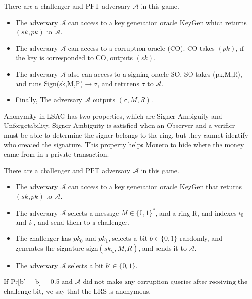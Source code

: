     \begin{definition} There are a challenger and PPT adversary $\mathcal A $ in this game.
    
    \begin{itemize}
    \item The adversary $\mathcal A $ can access to a key generation oracle KeyGen which returns $(sk,pk)$ to $\mathcal A $.
    \item The adversary $\mathcal A $ can access to a corruption oracle (CO). CO takes $(pk)$, if the key is corresponded to CO, outputs $(sk)$.
    \item The adversary $\mathcal A $ also can access to a signing oracle SO, SO takes (pk,M,R), and runs Sign(sk,M,R)$\rightarrow \sigma$, and returens $\sigma$ to $\mathcal A$.
    \item Finally, The adversary $\mathcal A $ outputs $(\sigma , M,R)$.
    \end{itemize}
    \end{definition}
    Anonymity in LSAG has two properties, which are Signer Ambiguity and Unforgetability. Signer Ambiguity is satisfied when an Observer and a verifier must be able to determine the signer belongs to the ring, but they cannot identify who created the signature. This property helps Monero to hide where the money came from in a private transaction.
    
    \begin{definition}[Anonymity] There are a challenger and PPT adversary $\mathcal A $ in this game.
    
    \begin{itemize}
        \item The adversary $\mathcal A $ can access to a key generation oracle KeyGen that returns $(sk,pk)$ to $\mathcal A $.
        \item  The adversary $\mathcal A $ selects a message $M \in \{ 0,1 \}^*$, and a ring R, and indexes $i_0$ and $i_1$, and send them to a challenger.
        \item The challenger has $pk_0$ and $pk_1$, selects a bit $b \in \{ 0,1 \}$ randomly, and generates the signature sign$(sk_{i_b},M,R)$, and sends it to $\mathcal A $.
        \item The adversary $\mathcal A $ selects a bit $b' \in \{ 0,1 \}$.
    \end{itemize}
    If Pr[b' = b] = 0.5 and $\mathcal A $ did not make any corruption queries after receiving the challenge bit, we say that the LRS is anonymous.
    \end{definition}
    
